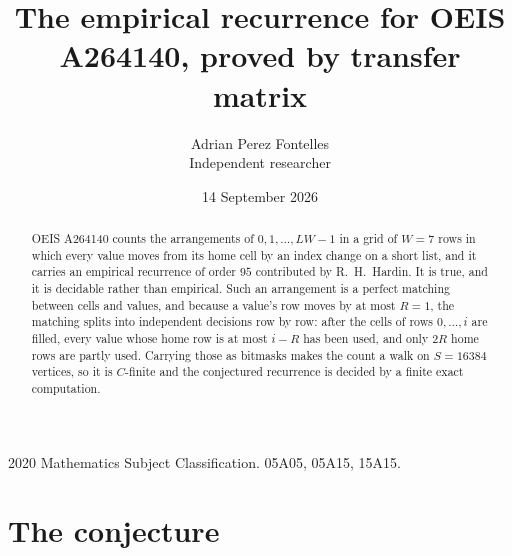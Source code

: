 \documentclass[11pt,a4paper]{article}
\title{The empirical recurrence for OEIS A264140, proved by transfer matrix}
\author{Adrian Perez Fontelles\\ \small Independent researcher}
\date{14 September 2026}
\theoremstyle{plain}
\theoremstyle{definition}
\begin{document}
\maketitle

\begin{abstract}
OEIS A264140 counts the arrangements of $0,1,\dots,LW-1$ in a grid of $W=7$ rows in which
every value moves from its home cell by an index change on a short list, and it carries an
empirical recurrence of order $95$ contributed by R.~H.~Hardin. It is true, and it is
decidable rather than empirical. Such an arrangement is a perfect matching between cells and
values, and because a value's row moves by at most $R=1$, the matching splits into
independent decisions row by row: after the cells of rows $0,\dots,i$ are filled,
every value whose home row is at most $i-R$ has been used, and only $2R$ home rows are
partly used. Carrying those as bitmasks makes the count a walk on $S=16384$ vertices, so it is
$C$-finite and the conjectured recurrence is decided by a finite exact computation.
\end{abstract}

\noindent\small 2020 Mathematics Subject Classification. 05A05, 05A15, 15A15.\normalsize

\section{The conjecture}
\end{document}
